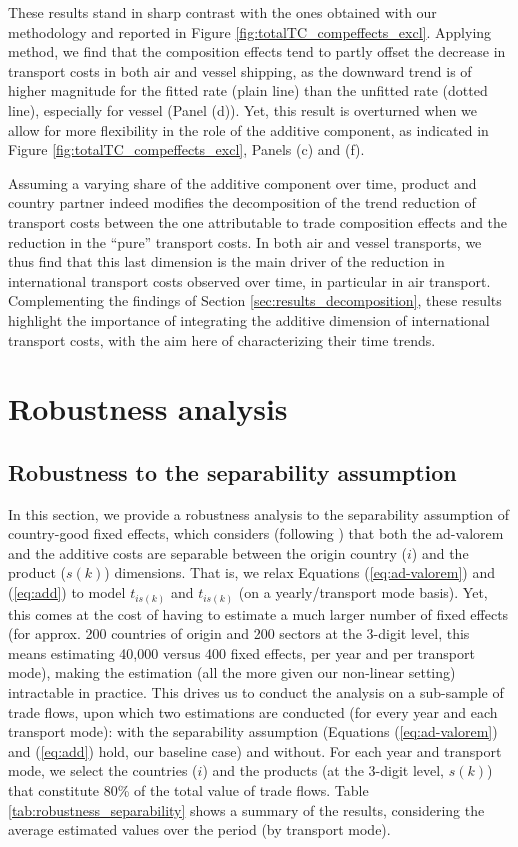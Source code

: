 \documentclass[a4paper,11pt]{article}
\begin{document}
These results stand in sharp contrast with the ones obtained with our methodology and reported in Figure \ref{fig:totalTC_compeffects_excl}.
Applying \cite{hummels2007} method, we find that the composition effects tend to partly offset the decrease in transport costs in both air and vessel shipping, as the downward trend is of higher magnitude for the fitted rate (plain line) than the unfitted rate (dotted line), especially for vessel (Panel (d)).
Yet, this result is overturned when we allow for more flexibility in the role of the additive component, as indicated in Figure \ref{fig:totalTC_compeffects_excl}, Panels (c) and (f).\medskip


Assuming a varying share of the additive component over time, product and country partner indeed modifies the decomposition of the trend reduction of transport costs between the one attributable to trade composition effects and the reduction in the ``pure'' transport costs.
In both air and vessel transports, we thus find that this last dimension is the main driver of the reduction in international transport costs observed over time, in particular in air transport.
Complementing the findings of Section \ref{sec:results_decomposition}, these results highlight the importance of integrating the additive dimension of international transport costs, with the aim here of characterizing their time trends.

\section{Robustness analysis \label{sec:robustness}}

\subsection{Robustness to the separability assumption}
In this section, we provide a robustness analysis to the separability assumption of country-good fixed effects, which considers (following \citealp{Irrazabal_2015}) that both the ad-valorem and the additive costs are separable between the origin country ($i$) and the product ($s(k)$) dimensions.
That is, we relax Equations (\ref{eq:ad-valorem}) and (\ref{eq:add}) to model $t_{is(k)}$ and $t_{is(k)}$ (on a yearly/transport mode basis).
Yet, this comes at the cost of having to estimate a much larger number of fixed effects (for approx. 200 countries of origin and 200 sectors at the 3-digit level, this means estimating 40,000 versus 400 fixed effects, per year and per transport mode), making the estimation (all the more given our non-linear setting) intractable in practice.
This drives us to conduct the analysis on a sub-sample of trade flows, upon which two estimations are conducted (for every year and each transport mode): with the separability assumption (Equations (\ref{eq:ad-valorem}) and (\ref{eq:add}) hold, our baseline case) and without.
For each year and transport mode, we select the countries ($i$) and the products (at the 3-digit level, $s(k)$) that constitute 80\% of the total value of trade flows. Table \ref{tab:robustness_separability} shows a summary of the results, considering the average estimated values over the period (by transport mode).
\end{document}
